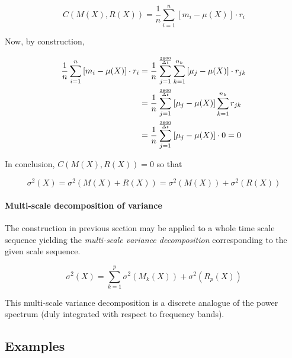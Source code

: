 \documentclass[a4paper,10pt]{book}
\begin{document}
\begin{equation}\label{eq:Covariance between scale approximation and residual 2}
	C(M(X), R(X)) = \frac{1}{n} \sum_{i=1}^{n} \left[
		m_{i} - \mu(X)
	\right] \cdot
	r_{i}
\end{equation}

\noindent Now, by construction,

\begin{align}
	\frac{1}{n} \sum_{i=1}^{n} \left[
		m_{i} - \mu(X)
	\right] \cdot
	r_{i} &= \frac{1}{n} \sum_{j=1}^{\frac{3600}{\Delta t}} \sum_{k=1}^{n_{k}} \left[
		\mu_{j} - \mu(X)
	\right] \cdot
	r_{jk} \notag \\
	&= \frac{1}{n} \sum_{j=1}^{\frac{3600}{\Delta t}} \left[
			\mu_{j} - \mu(X)
		\right]  \sum_{k=1}^{n_{k}}
		r_{jk} \notag \\ 
	&= \frac{1}{n} \sum_{j=1}^{\frac{3600}{\Delta t}} \left[
			\mu_{j} - \mu(X)
		\right] \cdot 0 = 0 \label{eq:Covariance between scale approximation and residual 3}
\end{align}

\noindent In conclusion, $C(M(X), R(X)) = 0$ so that

\begin{equation}\label{eq:Variance decomposition}
	\sigma^{2}(X) = \sigma^{2}(M(X) + R(X)) = \sigma^{2}(M(X)) + \sigma^{2}(R(X))
\end{equation}


\paragraph{Multi-scale decomposition of variance}

The construction in previous section may be applied to a whole time scale sequence yielding the \emph{multi-scale variance decomposition} corresponding to the given scale sequence.

\begin{equation}\label{eq:Multiscale variance decomposition}
	\sigma^{2}(X) = \sum_{k=1}^{p}\sigma^{2}(M_{k}(X)) + \sigma^{2} (R_{p}(X))
\end{equation}

This multi-scale variance decomposition is a discrete analogue of the power spectrum (duly integrated with respect to frequency bands).

\subsection{Examples}
\end{document}
